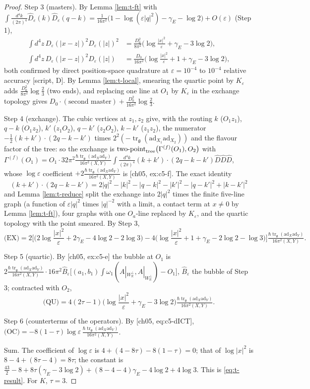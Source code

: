 \documentclass[11pt]{report}
\theoremstyle{plain}
\theoremstyle{definition}
\numberwithin{equation}{chapter}
\newcommand{\unit}{\tfrac{\hbar\operatorname{tr}_{\mathfrak g}(\mathrm{ad}_X\mathrm{ad}_Y)}{16\pi^2(X,Y)}}
\newcommand{\Wp}{W_{\mathbb R}^\perp}
\newcommand{\TPz}[2]{\mathrm{two\mbox{-}point}_{\rm tree}\big(#1,#2\big)}
\begin{document}
\begin{proof}
Step 3 (masters). By Lemma \ref{lem:t-ft} with $\int\frac{d^4k}{(2\pi)^4}\hat D_\varepsilon(k)\hat D_\varepsilon(q-k)=\frac{1}{16\pi^2}\big(1-\log(\varepsilon|q|^2)-\gamma_E-\log2\big)+O(\varepsilon)$ (Step 1),
\[
\begin{aligned}
\int d^4z\,D_\varepsilon(|x-z|)^2D_\varepsilon(|z|)^2&=\frac{D_0^2}{8\pi^2}\Big(\log\frac{|x|^2}\varepsilon+\gamma_E-3\log2\Big),\\
\int d^4z\,D_\varepsilon(|x-z|)^2D_\varepsilon(|z|)&=\frac{D_0}{16\pi^2}\Big(\log\frac{|x|^2}\varepsilon+1+\gamma_E-3\log2\Big),
\end{aligned}
\]
both confirmed by direct position-space quadrature at $\varepsilon=10^{-4}$ to $10^{-4}$ relative accuracy [script, D]. By Lemma \ref{lem:t-local}, smearing the quartic point by $K_\varepsilon$ adds $\frac{D_0^2}{8\pi^2}\log\frac23$ (two ends), and replacing one line at $O_1$ by $K_\varepsilon$ in the exchange topology gives $D_0\cdot(\text{second master})+\frac{D_0^2}{16\pi^2}\log\frac23$.

Step 4 (exchange). The cubic vertices at $z_1,z_2$ give, with the routing $k$ ($O_1z_1$), $q-k$ ($O_1z_2$), $k'$ ($z_1O_2$), $q-k'$ ($z_2O_2$), $k-k'$ ($z_1z_2$), the numerator $-\tfrac12(k+k')\cdot(2q-k-k')$ times $2^2(-\operatorname{tr}_{\mathfrak g}(\mathrm{ad}_{X_1}\mathrm{ad}_{X_2}))$ and the flavour factor of the tree: so the exchange is $\TPz{\Gamma^{(f)}(O_1)}{O_2}$ with $\Gamma^{(f)}(O_1)=O_1\cdot32\pi^2\unit\int\frac{d^4k}{(2\pi)^4}(k+k')\cdot(2q-k-k')\hat D\hat D\hat D$, whose $\log\varepsilon$ coefficient $+2\unit$ is [ch05, ex:c5-f]. The exact identity
\[
(k+k')\cdot(2q-k-k')=2|q|^2-|k|^2-|q-k|^2-|k'|^2-|q-k'|^2+|k-k'|^2
\]
and Lemma \ref{lem:t-reduce} split the exchange into $2|q|^2$ times the finite five-line graph (a function of $\varepsilon|q|^2$ times $|q|^{-2}$ with a limit, a contact term at $x\neq0$ by Lemma \ref{lem:t-ft}), four graphs with one $O_a$-line replaced by $K_\varepsilon$, and the quartic topology with the point smeared. By Step 3,
\[
\text{(EX)}=2\Big[\Big(2\log\frac{|x|^2}\varepsilon+2\gamma_E-4\log2-2\log3\Big)-4\Big(\log\frac{|x|^2}\varepsilon+1+\gamma_E-2\log2-\log3\Big)\Big]\unit .
\]

Step 5 (quartic). By [ch05, ex:c5-e] the bubble at $O_1$ is $2\unit\cdot16\pi^2\hat B_\varepsilon\big[(a_1,b_1)\int\omega_1(A|_{\Wp},A|_{\Wp})-O_1\big]$, $\hat B_\varepsilon$ the bubble of Step 3; contracted with $O_2$,
\[
\text{(QU)}=4(2\tau-1)\Big(\log\frac{|x|^2}\varepsilon+\gamma_E-3\log2\Big)\unit .
\]

Step 6 (counterterms of the operators). By [ch05, eq:c5-dICT], $\text{(OC)}=-8(1-\tau)\log\varepsilon\,\unit$.

Sum. The coefficient of $\log\varepsilon$ is $4+(4-8\tau)-8(1-\tau)=0$; that of $\log|x|^2$ is $8-4+(8\tau-4)=8\tau$; the constant is $\tfrac{43}2-8+8\tau(\gamma_E-3\log2)+(8-4-4)\gamma_E-4\log2+4\log3$. This is \eqref{eq:t-result}. For $K$, $\tau=3$.
\end{proof}
\end{document}
